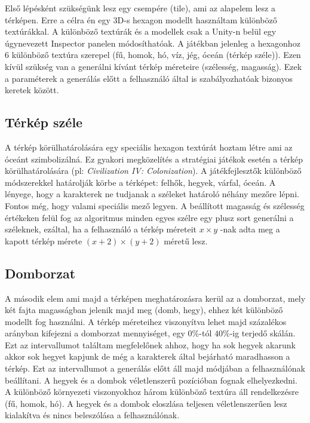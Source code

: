 Első lépésként szükségünk lesz egy csempére (tile), ami az alapelem lesz a térképen. Erre a célra én egy 3D-s hexagon modellt használtam különböző textúrákkal. A különböző textúrák és a modellek csak a Unity-n belül egy úgynevezett Inspector panelen módosíthatóak. A játékban jelenleg a hexagonhoz 6 különböző textúra szerepel (fű, homok, hó, víz, jég, óceán (térkép széle)).
\newline
\newline Ezen kívül szükség van a generálni kívánt térkép méreteire (szélesség, magasság). Ezek a paraméterek a generálás előtt a felhasználó által is szabályozhatóak bizonyos keretek között.

\subsection{Térkép széle}

A térkép körülhatárolására egy speciális hexagon textúrát hoztam létre ami az óceánt szimbolizálná. Ez gyakori megközelítés a stratégiai játékok esetén a térkép körülhatárolására (pl: \textit{Civilization IV: Colonization}). A játékfejlesztők különböző módszerekkel határolják körbe a térképet: felhők, hegyek, várfal, óceán. A lényege, hogy a karakterek ne tudjanak a széleket határoló néhány mezőre lépni. Fontos még, hogy valami speciális mező legyen.
\newline
\newline A beállított magasság és szélesség értékeken felül fog az algoritmus minden egyes szélre egy plusz sort generálni a széleknek, ezáltal, ha a felhasználó a térkép méreteit $x \times y$ -nak adta meg a kapott térkép mérete $(x+2) \times (y+2)$ méretű lesz.

\subsection{Domborzat}

A második elem ami majd a térképen meghatározásra kerül az a domborzat, mely két fajta magasságban jelenik majd meg (domb, hegy), ehhez két különböző modellt fog használni. A térkép méreteihez viszonyítva lehet majd százalékos arányban kifejezni a domborzat mennyiséget, egy $0\%$-tól $40\%$-ig terjedő skálán. Ezt az intervallumot találtam megfelelőnek ahhoz, hogy ha sok hegyek akarunk akkor sok hegyet kapjunk de még a karakterek által bejárható maradhasson a térkép. Ezt az intervallumot a generálás előtt áll majd módjában a felhasználónak beállítani. A hegyek és a dombok véletlenszerű pozícióban fognak elhelyezkedni. A különböző környezeti viszonyokhoz három különböző textúra áll rendelkezésre (fű, homok, hó). A hegyek és a dombok eloszlása teljesen véletlenszerűen lesz kialakítva és nincs beleszólása a felhasználónak.

